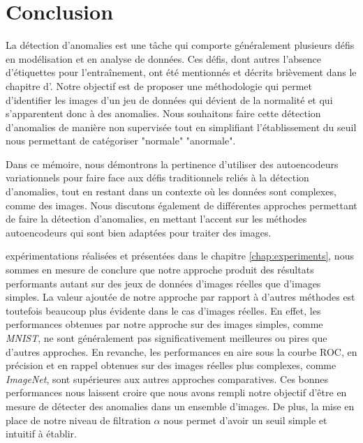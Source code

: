\chapter*{Conclusion}           %
\label{chap:conclusion}         %

La détection d'anomalies est une tâche qui comporte généralement plusieurs défis en modélisation et en analyse de données. Ces défis, dont \DIFdelbegin {}\DIFdelend \DIFaddbegin {}\DIFaddend autres l'absence d'étiquettes pour l'entraînement, ont été mentionnés et décrits brièvement dans le chapitre d'. Notre objectif est de proposer une méthodologie qui permet d'identifier les images d'un jeu de données qui dévient de la normalité et qui s'apparentent donc à des anomalies. Nous souhaitons faire cette détection d'anomalies de manière non supervisée tout en simplifiant l'établissement du seuil nous permettant de catégoriser \DIFdelbegin {}\DIFdelend \DIFaddbegin {}\DIFaddend "normale" \DIFdelbegin {}\DIFdelend \DIFaddbegin {}\DIFaddend "anormale". 

Dans ce mémoire, nous démontrons la pertinence d'utiliser des autoencodeurs variationnels pour faire face aux défis traditionnels reliés à la détection d'anomalies, tout en restant \DIFdelbegin {}\DIFdelend \DIFaddbegin {}\DIFaddend dans un contexte où les données sont complexes, comme des images. Nous discutons également de différentes approches permettant de faire la détection d'anomalies, en mettant l'accent sur les méthodes \DIFdelbegin {}\DIFdelend \DIFaddbegin {}\DIFaddend autoencodeurs qui sont bien adaptées pour traiter des images.

\DIFdelbegin {}\DIFdelend \DIFaddbegin {}\DIFaddend expérimentations réalisées et présentées dans le chapitre \ref{chap:experiments}, nous sommes en mesure de conclure que notre approche produit des résultats performants autant sur des jeux de données d'images réelles que d'images simples. La valeur ajoutée de notre approche par rapport à d'autres méthodes est toutefois beaucoup plus évidente dans le cas d'images réelles. En effet, les performances obtenues par notre approche sur des images simples, comme \textit{MNIST}, ne sont généralement pas significativement meilleures ou pires que d'autres approches. En revanche, les performances en aire sous la courbe ROC, en précision et en rappel obtenues sur des images réelles plus complexes, comme \textit{ImageNet}, sont supérieures aux autres approches comparatives. Ces bonnes performances nous laissent croire que nous avons rempli notre objectif d'être en mesure de détecter des anomalies dans un ensemble d'images. De plus, la mise en place de notre niveau de filtration $\alpha$ nous permet d'avoir un seuil simple et intuitif à établir.


